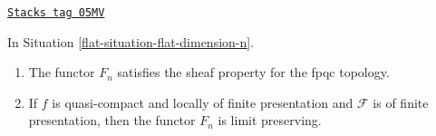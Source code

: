 \begin{lemma}
\label{flat-lemma-flat-dimension-n}
\href{https://stacks.math.columbia.edu/tag/05MV}{\texttt{Stacks tag 05MV}}

In Situation \ref{flat-situation-flat-dimension-n}.
\begin{enumerate}
\item The functor $F_n$ satisfies the sheaf property for the fpqc topology.
\item If $f$ is quasi-compact and locally of finite presentation
and $\mathcal{F}$ is of finite presentation, then the functor $F_n$ is
limit preserving.
\end{enumerate}
\end{lemma}

